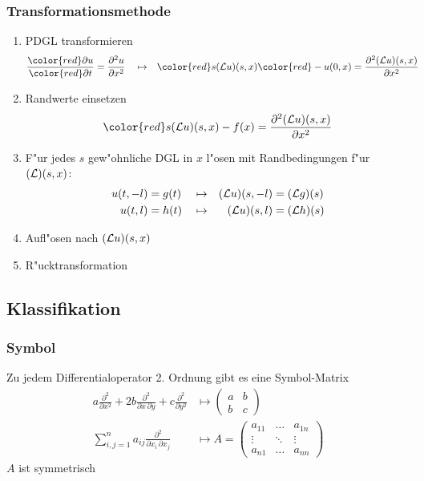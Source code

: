 \documentclass{beamer}
\begin{document}
\begin{frame}
\frametitle{Transformationsmethode}
\begin{enumerate}[<+->]
\item PDGL transformieren
\begin{align*}
\frac{{\color{red}\partial} u}{\color{red}\partial t}&=\frac{\partial^2 u}{\partial x^2}&
&\mapsto&
{\color{red}s} ({\cal L}u)(s,x){\color{red}-u(0,x)}&=\frac{\partial^2 ({\cal L}u)(s,x)}{\partial x^2}
\end{align*}
\item Randwerte einsetzen
\[
{\color{red}s}({\cal L}u)(s,x)-f(x)=\frac{\partial^2 ({\cal L}u)(s,x)}{\partial x^2}
\]
\item  F"ur jedes $s$ gew"ohnliche DGL in $x$ l"osen mit
Randbedingungen f"ur $({\cal L})(s,x)$:
\begin{align*}
u(t,-l)&=g(t)&&\mapsto&({\cal L}u)(s,-l)&=({\cal L}g)(s)\\
u(t,l)&=h(t)&&\mapsto&({\cal L}u)(s,l)&=({\cal L}h)(s)
\end{align*}
\item Aufl"osen nach $({\cal L}u)(s,x)$
\item R"ucktransformation
\end{enumerate}
\end{frame}

\begin{frame}
\section{Klassifikation}
\frametitle{Symbol}
Zu jedem Differentialoperator 2. Ordnung gibt es eine Symbol-Matrix
\begin{align*}
a\frac{\partial^2}{\partial x^2}
+2b\frac{\partial^2}{\partial x\,\partial y}
+c\frac{\partial^2}{\partial y^2}
&\mapsto
\begin{pmatrix}
a&b\\
b&c
\end{pmatrix}
\\
\sum_{i,j=1}^na_{ij}\frac{\partial^2}{\partial x_i\,\partial x_j}
&\mapsto
A=
\begin{pmatrix}
a_{11}&\dots &a_{1n}\\
\vdots&\ddots&\vdots\\
a_{n1}&\dots &a_{nn}
\end{pmatrix}
\end{align*}
$A$ ist symmetrisch
\end{frame}
\end{document}
